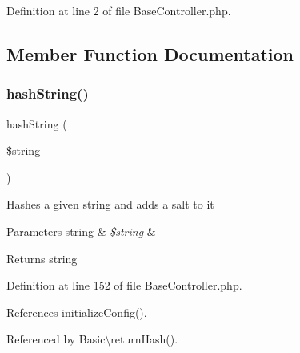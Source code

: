 Definition at line 2 of file Base\+Controller.\+php.



\subsection{Member Function Documentation}
\hypertarget{class_base_controller_ac7f37d2e13bade1709f5c88b02f0e9d1}{}\label{class_base_controller_ac7f37d2e13bade1709f5c88b02f0e9d1} 
\subsubsection{\texorpdfstring{hash\+String()}{hashString()}}
{\footnotesize\ttfamily hash\+String (\begin{DoxyParamCaption}\item[{}]{\$string }\end{DoxyParamCaption})\hspace{0.3cm}{\ttfamily [protected]}}

Hashes a given string and adds a salt to it


\begin{DoxyParams}[1]{Parameters}
string & {\em \$string} & \\
\hline
\end{DoxyParams}
\begin{DoxyReturn}{Returns}
string 
\end{DoxyReturn}


Definition at line 152 of file Base\+Controller.\+php.



References initialize\+Config().



Referenced by Basic\textbackslash{}return\+Hash().


\hypertarget{class_base_controller_a5fa8890bd3a9d20f5c0cc2377dc49eb1}{}\label{class_base_controller_a5fa8890bd3a9d20f5c0cc2377dc49eb1} 
